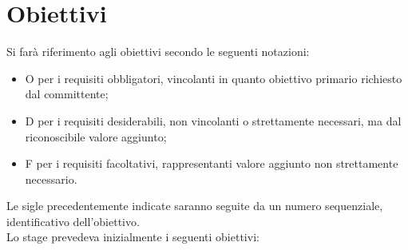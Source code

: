 \section{Obiettivi}
\label{sec:stage-obj}
Si farà riferimento agli obiettivi secondo le seguenti notazioni:
\begin{itemize}
	\item O per i requisiti obbligatori, vincolanti in quanto obiettivo primario richiesto dal committente;
	\item D per i requisiti desiderabili, non vincolanti o strettamente necessari,
		  ma dal riconoscibile valore aggiunto;
	\item F per i requisiti facoltativi, rappresentanti valore aggiunto non strettamente 
		  necessario.
\end{itemize}
Le sigle precedentemente indicate saranno seguite da un numero sequenziale, identificativo dell'obiettivo.
\\
Lo stage prevedeva inizialmente i seguenti obiettivi:
